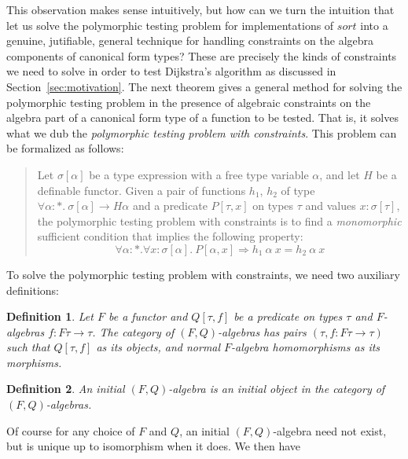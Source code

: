 \documentclass{article}[12 pt]
\newtheorem{definition}{Definition}
\theoremstyle{problemstyle}
\begin{document}
This observation makes sense intuitively, but how can we turn the
intuition that let us solve the polymorphic testing problem for
implementations of $\mathit{sort}$ into a genuine, jutifiable, general
technique for handling constraints on the algebra components of
canonical form types? These are precisely the kinds of constraints we
need to solve in order to test Dijkstra's algorithm as discussed in
Section~\ref{sec:motivation}. The next theorem gives a general method
for solving the polymorphic testing problem in the presence of
algebraic constraints on the algebra part of a canonical form type of
a function to be tested. That is, it solves what we dub the {\em
  polymorphic testing problem with constraints}. This problem can be
formalized as follows:

\begin{verse}\label{problem:poly-testing}
  \hspace*{0.2in}Let $\sigma[\alpha]$ be a type expression with a free
  type variable $\alpha$, and let $H$ be a definable functor. Given a
  pair of functions $h_1$, $h_2$ of type $\forall \alpha :
  *.~\sigma[\alpha] \to H\alpha$
  and a predicate $P[\tau,x]$ on types $\tau$ and values $x :
  \sigma[\tau]$, the polymorphic testing problem with constraints is
  to find a \emph{monomorphic} sufficient
  condition that implies the following property:
  \begin{equation}
    \label{eq:problem-constraints}
    \forall \alpha : *. \forall x : \sigma[\alpha].~P[\alpha,x]
    \Rightarrow h_1~\alpha~x = h_2~\alpha~x
  \end{equation}
\end{verse}

To solve the polymorphic testing problem with constraints, we need two
auxiliary definitions:

\begin{definition}
  Let $F$ be a functor and $Q[\tau,f]$ be a predicate on types $\tau$
  and $F$-algebras $f : F\tau \to \tau$. The \emph{category of
    $(F,Q)$-algebras} has pairs $(\tau, f : F\tau \to \tau)$ such that
  $Q[\tau,f]$ as its objects, and normal $F$-algebra homomorphisms as
  its morphisms.
\end{definition}

\begin{definition}
  An \emph{initial $(F,Q)$-algebra} is an initial object in the
  category of $(F,Q)$-algebras.
\end{definition}
\noindent
Of course for any choice of $F$ and $Q$, an initial $(F,Q)$-algebra
need not exist, but is unique up to isomorphism when it does. We then
have
\end{document}
